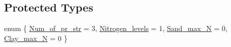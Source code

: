 \subsection*{Protected Types}
\begin{DoxyCompactItemize}
\item 
enum \{ \hyperlink{classstatic_barley_pea_a680507d0428387688395e055ebba3bcea96fa653d76410eb7b329bc3e1bd2d41a}{Num\_\-of\_\-pr\_\-str} = 3, 
\hyperlink{classstatic_barley_pea_a680507d0428387688395e055ebba3bceaaeb9eb82d16d51a4e6b7f400379ee6b0}{Nitrogen\_\-levels} = 1, 
\hyperlink{classstatic_barley_pea_a680507d0428387688395e055ebba3bcea55500289d24592dea2ca9aa692c94c2d}{Sand\_\-max\_\-N} = 0, 
\hyperlink{classstatic_barley_pea_a680507d0428387688395e055ebba3bcea0d9ad46ef7e4772cc6f8a2995f1cedde}{Clay\_\-max\_\-N} = 0
 \}
\end{DoxyCompactItemize}



